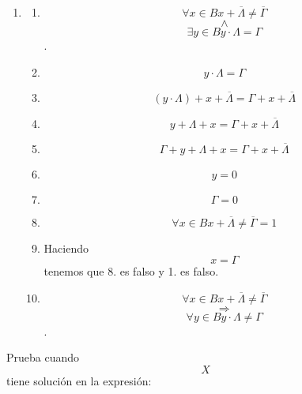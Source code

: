 \documentclass[
]{article}
\providecommand{\tightlist}{%
  \setlength{\itemsep}{0pt}\setlength{\parskip}{0pt}}
\begin{document}
\begin{enumerate}
\begin{enumerate}
\begin{enumerate}
\begin{enumerate}
\begin{enumerate}
          \begin{enumerate}
          \def\labelenumvi{\arabic{enumvi}.}
          \tightlist
          \item
            \begin{enumerate}
            \def\labelenumvii{\arabic{enumvii}.}
            \tightlist
            \item
              \[\forall{x \in B}{{x + \overline{\Lambda}} \neq \overline{\Gamma}}\]\[\land\]\[\exists{y \in B}{{y \cdot \Lambda} = \Gamma}\].
            \item
              \[{y \cdot \Lambda} = \Gamma\]
            \item
              \[{{{({y \cdot \Lambda})} + x} + \overline{\Lambda}} = {{\Gamma + x} + \overline{\Lambda}}\]
            \item
              \[{{y + \Lambda} + x} = {{\Gamma + x} + \overline{\Lambda}}\]
            \item
              \[{{{\Gamma + y} + \Lambda} + x} = {{\Gamma + x} + \overline{\Lambda}}\]
            \item
              \[y = 0\]
            \item
              \[\Gamma = 0\]
            \item
              \[\forall{x \in B}{{{x + \overline{\Lambda}} \neq \overline{\Gamma}} = 1}\]
            \item
              Haciendo \[x = \Gamma\] tenemos que 8. es falso y 1. es
              falso.
            \item
              \[\forall{x \in B}{{x + \overline{\Lambda}} \neq \overline{\Gamma}}\]\[\Rightarrow\]\[\forall{y \in B}{{y \cdot \Lambda} \neq \Gamma}\].
            \end{enumerate}
          \end{enumerate}

          Prueba cuando \[X\] tiene solución en la expresión:


\end{enumerate}
\end{enumerate}
\end{enumerate}
\end{enumerate}
\end{enumerate}
\end{document}
